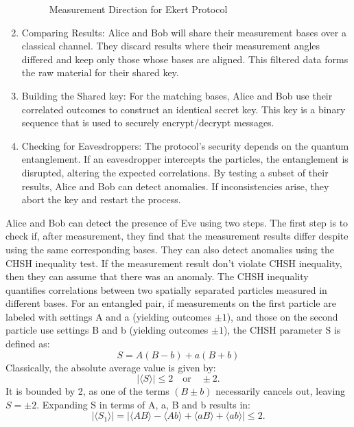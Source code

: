 \documentclass[12pt]{article}
\begin{document}
\begin{enumerate}
        \begin{figure}[h]
          \centering
          
          \caption{Measurement Direction for Ekert Protocol}
          \label{fig:mesurement_direction}
        \end{figure}

  \item Comparing Results:  Alice and Bob will share their measurement bases over a classical channel. They discard results where their measurement angles differed and keep only those whose bases are aligned. This filtered data forms the raw material for their shared key.
  \item Building the Shared key: For the matching bases, Alice and Bob use their correlated outcomes to construct an identical secret key. This key is a binary sequence that is used to securely encrypt/decrypt messages.
  \item Checking for Eavesdroppers: The protocol's security depends on the quantum entanglement. If an eavesdropper intercepts the particles, the entanglement is disrupted, altering the expected correlations. By testing a subset of their results, Alice and Bob can detect anomalies. If inconsistencies arise, they abort the key and restart the process.
\end{enumerate}

Alice and Bob can detect the presence of Eve using two steps. The first step is to check if, after measurement, they find that the measurement results differ despite using the same corresponding bases. They can also detect anomalies using the CHSH inequality test. If the measurement result don't violate CHSH inequality, then they can assume that there was an anomaly.
The CHSH inequality quantifies correlations between two spatially separated particles measured in different bases. For an entangled pair, if measurements on the first particle are labeled with settings A and a (yielding outcomes $ \pm 1 $), and those on the second particle use settings B and b (yielding outcomes $ \pm 1 $), the CHSH parameter S is defined as:
\begin{equation}
  S = A(B - b) + a(B + b)
\end{equation}
Classically, the absolute average value is given by:
\[
  |\langle S \rangle| \leq 2 \quad \text{or} \quad \pm 2.
\]
It is bounded by 2, as one of the terms \( (B \pm b) \) necessarily cancels out, leaving \( S = \pm 2 \).
Expanding S in terms of A, a, B and b results in:
\[
  \left| \langle S_1 \rangle \right| = \left| \langle AB \rangle - \langle Ab \rangle + \langle aB \rangle + \langle ab \rangle \right| \leq 2.
\]
\end{document}
